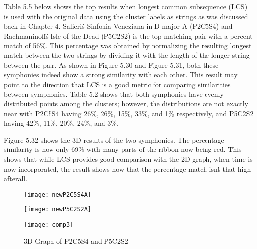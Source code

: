 Table 5.5 below shows the top results when longest common subsequence (LCS) is used with the original data using the cluster labels as strings as was discussed back in Chapter 4. Salieri\'s Sinfonia Veneziana in D major A (P2C5S4) and Rachmaninoff\'s Isle of the Dead (P5C2S2) is the top matching pair with a percent match of 56\%. This percentage was obtained by normalizing the resulting longest match between the two strings by dividing it with the length of the longer string between the pair. As shown in Figure 5.30 and Figure 5.31, both these symphonies indeed show a strong similarity with each other. This result may point to the direction that LCS is a good metric for comparing similarities between symphonies. Table 5.2 shows that both symphonies have evenly distributed points among the clusters; however, the distributions are not exactly near with P2C5S4 having 26\%, 26\%, 15\%, 33\%, and 1\% respectively, and P5C2S2 having 42\%, 11\%, 20\%, 24\%, and 3\%.

Figure 5.32 shows the 3D results of the two symphonies. The percentage similarity is now only 69\% with many parts of the ribbon now being red. This shows that while LCS provides good comparison with the 2D graph, when time is now incorporated, the result shows now that the percentage match isn\'t that high afterall.

\begin{figure}[H]
\begin{minipage}{.5\textwidth}
  \centering
  \texttt{[image: newP2C5S4A]}
  \label{fig:test1}
\end{minipage}
\begin{minipage}{.5\textwidth}
  \centering
  \texttt{[image: newP5C2S2A]}
  \label{fig:test2}
\end{minipage}
\end{figure}

\begin{figure}[H]
\caption{3D Graph of P2C5S4 and P5C2S2}
\centering
\texttt{[image: comp3]}
\end{figure}

